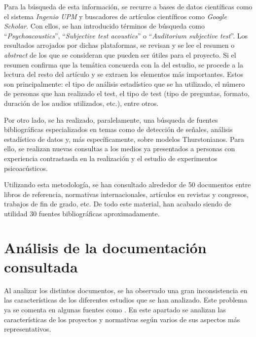 \documentclass[11pt,a4paper]{book}
\begin{document}
    Para la búsqueda de esta información, se recurre a bases de datos científicas como el sistema \textit{Ingenio UPM} y buscadores de artículos científicos como \textit{Google Scholar}. Con ellos, se han introducido términos de búsqueda como ``\textit{Psychoacoustics}'', ``\textit{Subjective test acoustics}'' o ``\textit{Auditorium subjective test}''. Los resultados arrojados por dichas plataformas, se revisan y se lee el resumen o \textit{abstract} de los que se consideran que pueden ser útiles para el proyecto. Si el resumen confirma que la temática concuerda con la del estudio, se procede a la lectura del resto del artículo y se extraen los elementos más importantes. Estos son principalmente: el tipo de análisis estadístico que se ha utilizado, el número de personas que han realizado el test, el tipo de test (tipo de preguntas, formato, duración de los audios utilizados, etc.), entre otros.
    
    Por otro lado, se ha realizado, paralelamente, una búsqueda de fuentes bibliográficas especializados en temas como de detección de señales, análisis estadístico de datos y, más específicamente, sobre modelos Thurstonianos. Para ello, se realizan nuevas consultas a los medios ya presentados a personas con experiencia contrastasda en la realización y el estudio de experimentos psicoacústicos.\newline
    
    Utilizando esta metodología, se han consultado alrededor de 50 documentos entre libros de referencia, normativas internacionales, artículos en revistas y congresos, trabajos de fin de grado, etc. De todo este material, han acabado siendo de utilidad 30 fuentes bibliográficas aproximadamente.
    
    \section{Análisis de la documentación consultada}
    
    Al analizar los distintos documentos, se ha observado una gran inconsistencia en las características de los diferentes estudios que se han analizado. Este problema ya se comenta en algunas fuentes como \cite{Tejada2020}. En este apartado se analizan las características de los proyectos y normativas según varios de sus aspectos más representativos. 
    
\end{document}
